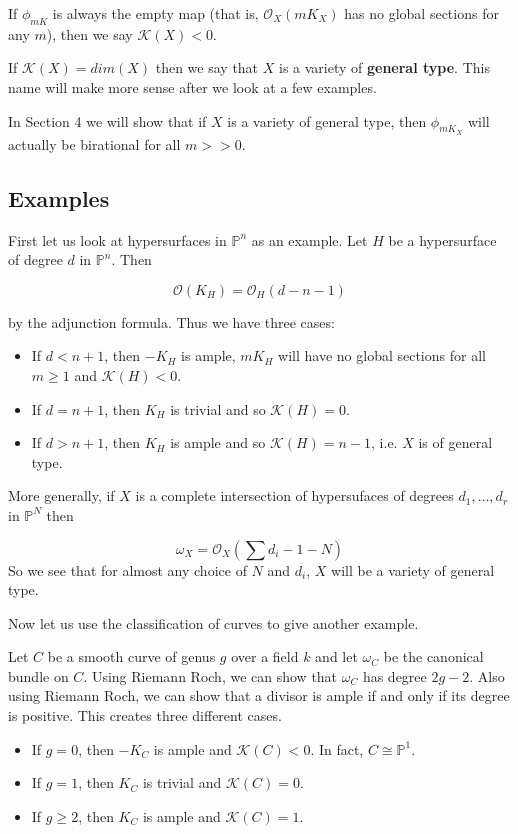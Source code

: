 \documentclass[a4paper]{article}
\newcommand{\Oc}{\mathcal{O}}
\numberwithin{theorem}{section}
\begin{document}
If $\phi_{mK}$ is always the empty map (that is, $\Oc_X(mK_X)$ has no global sections for any $m$), then we say $\mathcal{K}(X) < 0$.

If $\mathcal{K}(X) = dim(X)$ then we say that $X$ is a variety of \textbf{general type}. This name will make more sense after we look at a few examples.

In Section 4 we will show that if $X$ is a variety of general type, then $\phi_{mK_X}$ will actually be birational for all $m >> 0$.

\subsection{Examples}

First let us look at hypersurfaces in $\mathbb{P}^n$ as an example. Let $H$ be a hypersurface of degree $d$ in $\mathbb{P}^n$. Then

$$ \mathcal{O}(K_H) = \mathcal{O}_H(d-n-1) $$

by the adjunction formula. Thus we have three cases: 

\begin{itemize}
\item If $d < n+1$, then $-K_H$ is ample, $mK_H$ will have no global sections for all $m \geq 1$ and $\mathcal{K}(H) < 0$.
\item If $d = n+1$, then $K_H$ is trivial and so $\mathcal{K}(H) = 0$.
\item If $d > n+1$, then $K_H$ is ample and so $\mathcal{K}(H) = n-1$, i.e. $X$ is of general type.
\end{itemize}

More generally, if $X$ is a complete intersection of hypersufaces of degrees $d_1,\dots,d_r$ in $\mathbb{P}^N$ then 

$$ \omega_X = \Oc_X\left(\sum d_i -1-N\right) $$So we see that for almost any choice of $N$ and $d_i$, $X$ will be a variety of general type.

\vspace{0.5cm}

Now let us use the classification of curves to give another example.

Let $C$ be a smooth curve of genus $g$ over a field $k$ and let $\omega_C$ be the canonical bundle on $C$. Using Riemann Roch, we can show that $\omega_C$ has degree $2g - 2$. Also using Riemann Roch, we can show that a divisor is ample if and only if its degree is positive. This creates three different cases.

\begin{itemize}
\item If $g = 0$, then $-K_C$ is ample and $\mathcal{K}(C) < 0$. In fact, $C \cong \mathbb{P}^1$.
\item If $g = 1$, then $K_C$ is trivial and $\mathcal{K}(C) = 0$.
\item If $g \geq 2$, then $K_C$ is ample and $\mathcal{K}(C) = 1$.
\end{itemize}
\end{document}
